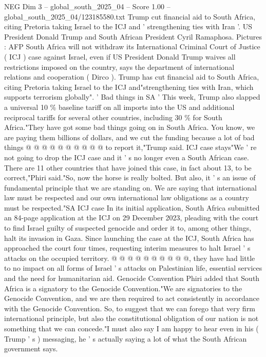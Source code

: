 \begin{textsample}{NEG Dim 3 – global\_south\_2025\_04 – Score 1.00 – global\_south\_2025\_04/123185580.txt}  \label{ex:f3_neg_347}
Trump cut financial aid to South Africa, citing Pretoria taking Israel to the ICJ and ' strengthening ties with Iran '.
US President Donald Trump and South African President Cyril Ramaphosa.
Pictures : AFP South Africa will not withdraw its International Criminal Court of Justice ( ICJ ) case against Israel, even if US President Donald Trump waives all restrictions imposed on the country, says the department of international relations and cooperation ( Dirco ).
Trump has cut financial aid to South Africa, citing Pretoria taking Israel to the ICJ and"strengthening ties with Iran, which supports terrorism globally". ' Bad things in SA ' This week, Trump also slapped a universal 10 \% baseline tariff on all imports into the US and additional reciprocal tariffs for several other countries, including 30 \% for South Africa."They have got some bad things going on in South Africa.
You know, we are paying them billions of dollars, and we cut the funding because a lot of bad things @ @ @ @ @ @ @ @ @ @ to report it,"Trump said.
ICJ case stays"We ' re not going to drop the ICJ case and it ' s no longer even a South African case.
There are 11 other countries that have joined this case, in fact about 13, to be correct,"Phiri said."So, now the horse is really bolted.
But also, it ' s an issue of fundamental principle that we are standing on.
We are saying that international law must be respected and our own international law obligations as a country must be respected."SA ICJ case In its initial application, South Africa submitted an 84-page application at the ICJ on 29 December 2023, pleading with the court to find Israel guilty of suspected genocide and order it to, among other things, halt its invasion in Gaza.
Since launching the case at the ICJ, South Africa has approached the court four times, requesting interim measures to halt Israel ' s attacks on the occupied territory. @ @ @ @ @ @ @ @ @ @, they have had little to no impact on all forms of Israel ' s attacks on Palestinian life, essential services and the need for humanitarian aid.
Genocide Convention Phiri added that South Africa is a signatory to the Genocide Convention."We are signatories to the Genocide Convention, and we are then required to act consistently in accordance with the Genocide Convention.
So, to suggest that we can forego that very firm international principle, but also the constitutional obligation of our nation is not something that we can concede."I must also say I am happy to hear even in his ( Trump ' s ) messaging, he ' s actually saying a lot of what the South African government says.

\end{textsample}

